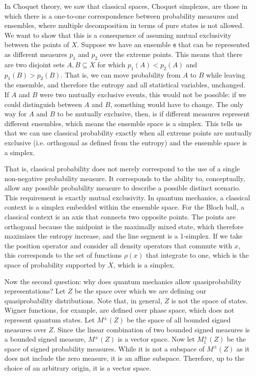 \documentclass[10pt,twocolumn, nofootinbib]{revtex4-2}
\newcommand{\ens}[1][e] {\mathsf{#1}} %
\begin{document}
In Choquet theory, we saw that classical spaces, Choquet simplexes, are those in which there is a one-to-one correspondence between probability measures and ensembles, where multiple decomposition in terms of pure states is not allowed. We want to show that this is a consequence of assuming mutual exclusivity between the points of $X$. Suppose we have an ensemble $\ens$ that can be represented as different measures $p_1$ and $p_2$ over the extreme points. This means that there are two disjoint sets $A, B \subseteq X$ for which $p_1(A) < p_2(A)$ and $p_1(B) > p_2(B)$. That is, we can move probability from $A$ to $B$ while leaving the ensemble, and therefore the entropy and all statistical variables, unchanged. If $A$ and $B$ were two mutually exclusive events, this would not be possible: if we could distinguish between $A$ and $B$, something would have to change. The only way for $A$ and $B$ to be mutually exclusive, then, is if different measures represent different ensembles, which means the ensemble space is a simplex. This tells us that we can use classical probability exactly when all extreme points are mutually exclusive (i.e. orthogonal as defined from the entropy) and the ensemble space is a simplex.

That is, classical probability does not merely correspond to the use of a single non-negative probability measure. It corresponds to the ability to, conceptually, allow any possible probability measure to describe a possible distinct scenario. This requirement is exactly mutual exclusivity. In quantum mechanics, a classical context is a simplex embedded within the ensemble space. For the Bloch ball, a classical context is an axis that connects two opposite points. The points are orthogonal because the midpoint is the maximally mixed state, which therefore maximizes the entropy increase, and the line segment is a 1-simplex. If we take the position operator and consider all density operators that commute with $x$, this corresponds to the set of functions $\rho(x)$ that integrate to one, which is the space of probability supported by $X$, which is a simplex.

Now the second question: why does quantum mechanics allow quasiprobability representations? Let $Z$ be the space over which we are defining our quasiprobability distributions. Note that, in general, $Z$ is not the space of states. Wigner functions, for example, are defined over phase space, which does not represent quantum states. Let $M^{\pm}(Z)$ be the space of all bounded signed measures over $Z$. Since the linear combination of two bounded signed measures is a bounded signed measure, $M^{\pm}(Z)$ is a vector space. Now let $M_1^{\pm}(Z)$ be the space of signed probability measures. While it is not a subspace of $M^{\pm}(Z)$ as it does not include the zero measure, it is an affine subspace. Therefore, up to the choice of an arbitrary origin, it is a vector space.
\end{document}
